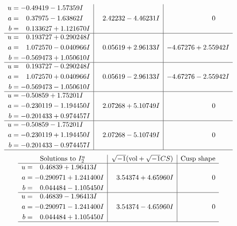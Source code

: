 \documentclass[1p]{elsarticle_modified}
\theoremstyle{definition}
\newcommand{\I}{\sqrt{-1}}
\begin{document}
$$\begin{array}{c|c|c}
\begin{aligned}
u &= -0.49419 - 1.57359 I \\
a &= \phantom{-}0.37975 - 1.63862 I \\
b &= \phantom{-}0.133627 + 1.121670 I\end{aligned}
 & \phantom{-}2.42232 - 4.46231 I & \phantom{-0.000000 } 0 \\ \hline\begin{aligned}
u &= \phantom{-}0.193727 + 0.290248 I \\
a &= \phantom{-}1.072570 - 0.040966 I \\
b &= -0.569473 + 1.050610 I\end{aligned}
 & \phantom{-}0.05619 + 2.96133 I & -4.67276 + 2.55942 I \\ \hline\begin{aligned}
u &= \phantom{-}0.193727 - 0.290248 I \\
a &= \phantom{-}1.072570 + 0.040966 I \\
b &= -0.569473 - 1.050610 I\end{aligned}
 & \phantom{-}0.05619 - 2.96133 I & -4.67276 - 2.55942 I \\ \hline\begin{aligned}
u &= -0.50859 + 1.75201 I \\
a &= -0.230119 - 1.194450 I \\
b &= -0.201433 + 0.974457 I\end{aligned}
 & \phantom{-}2.07268 + 5.10749 I & \phantom{-0.000000 } 0 \\ \hline\begin{aligned}
u &= -0.50859 - 1.75201 I \\
a &= -0.230119 + 1.194450 I \\
b &= -0.201433 - 0.974457 I\end{aligned}
 & \phantom{-}2.07268 - 5.10749 I & \phantom{-0.000000 } 0\\
 \hline 
 \end{array}$$\newpage$$\begin{array}{c|c|c}  
\text{Solutions to }I^u_{2}& \I (\text{vol} + \sqrt{-1}CS) & \text{Cusp shape}\\
 \hline 
\begin{aligned}
u &= \phantom{-}0.46839 + 1.96413 I \\
a &= -0.290971 + 1.241400 I \\
b &= \phantom{-}0.044484 - 1.105450 I\end{aligned}
 & \phantom{-}3.54374 + 4.65960 I & \phantom{-0.000000 } 0 \\ \hline\begin{aligned}
u &= \phantom{-}0.46839 - 1.96413 I \\
a &= -0.290971 - 1.241400 I \\
b &= \phantom{-}0.044484 + 1.105450 I\end{aligned}
 & \phantom{-}3.54374 - 4.65960 I & \phantom{-0.000000 } 0\\
 \hline 
 \end{array}$$\newpage\newpage\renewcommand{\arraystretch}{1}
\end{document}
